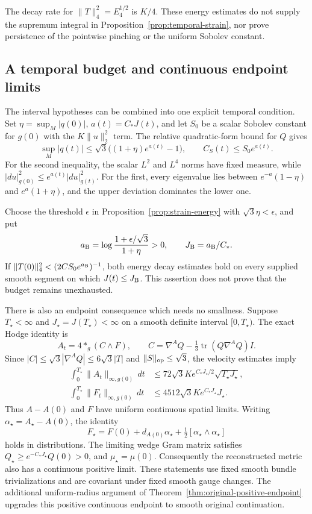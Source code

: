 \documentclass[11pt]{article}
\numberwithin{equation}{section}
\theoremstyle{definition}
\theoremstyle{remark}
\begin{document}
The decay rate for $\|T\|_4^2=E_4^{1/2}$ is $K/4$.
These energy estimates do not supply the supremum integral in
Proposition~\ref{prop:temporal-strain}, nor prove persistence of the
pointwise pinching or the uniform Sobolev constant.

\subsection{A temporal budget and continuous endpoint limits}
\label{subsec:temporal-budget}

The interval hypotheses can be combined into one explicit temporal
condition.  Set $\eta=\sup_M|q(0)|$, $a(t)=C_*J(t)$, and let $S_0$
be a scalar Sobolev constant for $g(0)$ with the $K\|u\|_2^2$ term.
The relative quadratic-form bound for $Q$ gives
\begin{equation}\label{flow:budget-pinching}
 \sup_M|q(t)|\le\sqrt3\bigl((1+\eta)e^{a(t)}-1\bigr),
 \qquad C_S(t)\le S_0e^{a(t)}.
\end{equation}
For the second inequality, the scalar $L^2$ and $L^4$ norms have
fixed measure, while $|du|_{g(0)}^2\le e^{a(t)}|du|_{g(t)}^2$.
For the first, every eigenvalue lies between
$e^{-a}(1-\eta)$ and $e^a(1+\eta)$, and the upper deviation
dominates the lower one.

Choose the threshold $\epsilon$ in Proposition~\ref{prop:strain-energy}
with $\sqrt3\eta<\epsilon$, and put
\[
 a_{\rm B}=\log\frac{1+\epsilon/\sqrt3}{1+\eta}>0,\qquad
 J_{\rm B}=a_{\rm B}/C_*.
\]
If $\|T(0)\|_4^2<(2CS_0e^{a_{\rm B}})^{-1}$, both energy
decay estimates hold on every supplied smooth segment on which
$J(t)\le J_{\rm B}$.  This assertion does not prove that the
budget remains unexhausted.

There is also an endpoint consequence which needs no smallness.
Suppose $T_\star<\infty$ and $J_\star=J(T_\star)<\infty$ on a
smooth definite interval $[0,T_\star)$.  The exact Hodge identity is
\[
 A_t=4*_{g}(C\wedge F),\qquad
 C=\nabla^AQ-\tfrac13\operatorname{tr}(Q\nabla^AQ)I.
\]
Since $|C|\le\sqrt3|\nabla^AQ|\le6\sqrt3|T|$ and
$\|S\|_{\rm op}\le\sqrt3$, the velocity estimates imply
\begin{align}
 \int_0^{T_\star}\|A_t\|_{\infty,g(0)}\,dt
 &\le72\sqrt3K e^{C_*J_\star/2}\sqrt{T_\star J_\star},
 \label{flow:endpoint-A}\\
 \int_0^{T_\star}\|F_t\|_{\infty,g(0)}\,dt
 &\le4512\sqrt3K e^{C_*J_\star}J_\star.
 \label{flow:endpoint-F}
\end{align}
Thus $A-A(0)$ and $F$ have uniform continuous spatial limits.
Writing $\alpha_\star=A_\star-A(0)$, the identity
\[
 F_\star=F(0)+d_{A(0)}\alpha_\star
                   +\tfrac12[\alpha_\star\wedge\alpha_\star]
\]
holds in distributions.  The limiting wedge Gram matrix satisfies
$Q_\star\ge e^{-C_*J_\star}Q(0)>0$, and $\mu_\star=\mu(0)$.
Consequently the reconstructed metric also has a continuous positive
limit.  These statements use fixed smooth bundle trivializations and
are covariant under fixed smooth gauge changes. The additional
uniform-radius argument of
Theorem~\ref{thm:original-positive-endpoint} upgrades this
positive continuous endpoint to smooth original continuation.
\end{document}

